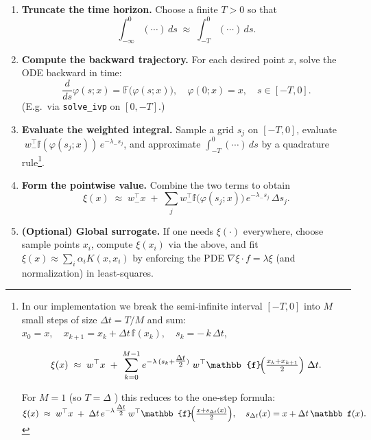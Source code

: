 \documentclass[11pt]{article}
\theoremstyle{plain}
\def\[{\begin{equation}}
\def\]{\end{equation}}
\begin{document}
\begin{enumerate}
  \item[i.] \textbf{Truncate the time horizon.}  
    Choose a finite \(T>0\) so that
    \[
      \int_{-\infty}^0(\cdots)\,ds
      \;\approx\;
      \int_{-T}^0(\cdots)\,ds.
    \]
    
  \item[ii.] \textbf{Compute the backward trajectory.} 
    For each desired point \(x\), solve the ODE backward in time:
    \[
      \frac{d}{ds}\varphi(s;x)=\mathbb{F}\bigl(\varphi(s;x)\bigr),
      \quad
      \varphi(0;x)=x,
      \quad
      s\in[-T,0].
    \]
    (E.g.\ via \texttt{solve\_ivp} on \([0,-T]\).)
    
  \item[iii.] \textbf{Evaluate the weighted integral.}  
    Sample a grid \(s_j\) on \([-T,0]\), evaluate
    \(\;w_-^{\!\top}{\mathbb f}(\varphi(s_j;x))\,e^{-\lambda_-s_j}\),
    and approximate
    \(\int_{-T}^0(\cdots)\,ds\) by a quadrature rule\footnote{{In our implementation we break the semi‐infinite interval \([-T,0]\) into \(M\) small steps of size \(\Delta t = T/M\) and sum:
$ x_0 = x,\quad
 x_{k+1} = x_k + \Delta t\,{\mathbb f}(x_k),\quad
 s_k = -\,k\,\Delta t $,

 \[
 \xi(x)\;\approx\;
w^\top x
 \;+\;
 \sum_{k=0}^{M-1}
 e^{-\lambda\,(s_k + \tfrac{\Delta t}{2})}\;
 w^\top
 \mathbb{f}\!\Bigl(\tfrac{x_k + x_{k+1}}{2}\Bigr)\;
 \Delta t.
 \]

For $M=1$ (so $T=\Delta$ ) this reduces to the one‐step formula: $\xi(x)\;\approx\;
 w^\top x
 \;+\;
 \Delta t\,
 e^{-\lambda\,\tfrac{\Delta t}{2}}\,
 w^\top
 \mathbb{f}\!\Bigl(\tfrac{x + s_{\Delta t}(x)}{2}\Bigr),
 \quad
 s_{\Delta t}(x)=x + \Delta t\,{\mathbb f}(x).
 $
 }}.
    
  \item[iv.] \textbf{Form the pointwise value.}  
    Combine the two terms to obtain
    \[
      \xi(x)\;\approx\;
      w_-^{\!\top}x
      \;+\;
      \sum_j
      w_-^{\!\top}\mathbb{f}\bigl(\varphi(s_j;x)\bigr)\,
      e^{-\lambda_-s_j}\,\Delta s_j.
    \]
    
  \item[v.] \textbf{(Optional) Global surrogate.}  
    If one needs \(\xi(\cdot)\) everywhere, choose sample points \(x_i\),
    compute \(\xi(x_i)\) via the above, and fit
    \(\displaystyle \xi(x)\approx\sum_i\alpha_i K(x,x_i)\)
    by enforcing the PDE
    \(\nabla\xi\cdot f=\lambda \xi\) (and normalization) in least‐squares.
\end{enumerate}
\end{document}
